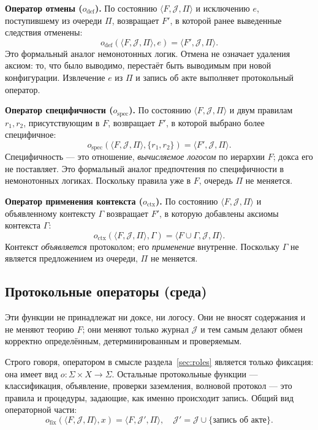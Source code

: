 \documentclass[12pt,a4paper]{article}
\begin{document}
\textbf{Оператор отмены ($o_{\text{def}}$).} По состоянию
$\langle F, \mathcal{J}, \Pi \rangle$ и исключению $e$, поступившему из
очереди $\Pi$, возвращает $F'$, в которой ранее выведенные следствия
отменены:
\[
o_{\text{def}}(\langle F, \mathcal{J}, \Pi \rangle, e)
= \langle F', \mathcal{J}, \Pi \rangle.
\]
Это формальный аналог немонотонных логик. Отмена не означает удаления
аксиом: то, что было выводимо, перестаёт быть выводимым при новой
конфигурации. Извлечение $e$ из $\Pi$ и запись об акте выполняет
протокольный оператор.

\textbf{Оператор специфичности ($o_{\text{spec}}$).} По состоянию
$\langle F, \mathcal{J}, \Pi \rangle$ и двум правилам $r_1, r_2$,
присутствующим в $F$, возвращает $F'$, в которой выбрано более специфичное:
\[
o_{\text{spec}}(\langle F, \mathcal{J}, \Pi \rangle, \{r_1, r_2\})
= \langle F', \mathcal{J}, \Pi \rangle.
\]
Специфичность --- это отношение, \emph{вычисляемое логосом} по иерархии
$F$; докса его не поставляет. Это формальный аналог предпочтения по
специфичности в немонотонных логиках. Поскольку правила уже в $F$, очередь
$\Pi$ не меняется.

\textbf{Оператор применения контекста ($o_{\text{ctx}}$).} По состоянию
$\langle F, \mathcal{J}, \Pi \rangle$ и объявленному контексту $\Gamma$
возвращает $F'$, в которую добавлены аксиомы контекста $\Gamma$:
\[
o_{\text{ctx}}(\langle F, \mathcal{J}, \Pi \rangle, \Gamma)
= \langle F \cup \Gamma, \mathcal{J}, \Pi \rangle.
\]
Контекст \emph{объявляется} протоколом; его \emph{применение} внутренне.
Поскольку $\Gamma$ не является предложением из очереди, $\Pi$ не меняется.

\subsection{Протокольные операторы (среда)}
\label{sec:protocol}

Эти функции не принадлежат ни доксе, ни логосу. Они не вносят содержания
и не меняют теорию $F$; они меняют только журнал $\mathcal{J}$ и тем самым
делают обмен корректно определённым, детерминированным и проверяемым.

Строго говоря, оператором в смысле раздела~\ref{sec:roles} является только
фиксация: она имеет вид $o: \Sigma \times X \to \Sigma$. Остальные
протокольные функции --- классификация, объявление, проверки заземления,
волновой протокол --- это правила и процедуры, задающие, как именно
происходит запись. Общий вид операторной части:
\[
o_{\text{fix}}(\langle F, \mathcal{J}, \Pi \rangle, x)
= \langle F, \mathcal{J}', \Pi \rangle,
\quad \mathcal{J}' = \mathcal{J} \cup \{\text{запись об акте}\}.
\]
\end{document}
